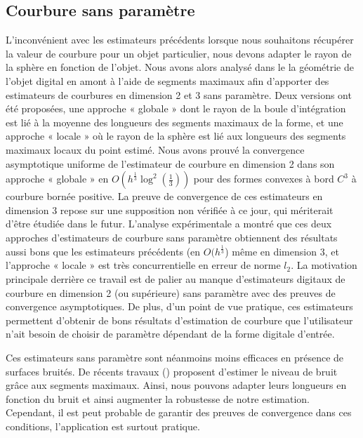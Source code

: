 \subsection*{Courbure sans paramètre}
%
L'inconvénient avec les estimateurs précédents lorsque nous souhaitons récupérer
la valeur de courbure pour un objet particulier, nous devons adapter le rayon de
la sphère en fonction de l'objet. Nous avons alors analysé dans le
 la géométrie de l'objet digital en amont à
l'aide de segments maximaux afin d'apporter des estimateurs de courbures en
dimension 2 et 3 sans paramètre. Deux versions ont été proposées, une approche «
globale » dont le rayon de la boule d'intégration est lié à la moyenne des
longueurs des segments maximaux de la forme, et une approche « locale » où le
rayon de la sphère est lié aux longueurs des segments maximaux locaux du point
estimé.
%
Nous avons prouvé la convergence asymptotique uniforme de l'estimateur de
courbure en dimension 2 dans son approche « globale » en $O\left(h^\frac{1}{3} \log^2
\left(\frac{1}{3}\right)\right)$ pour des formes convexes à bord $C^3$ à courbure
bornée positive. La preuve de convergence de ces estimateurs en dimension 3
repose sur une supposition non vérifiée à ce jour, qui mériterait d'être étudiée
dans le futur.
%
L'analyse expérimentale a montré que ces deux approches d'estimateurs de
courbure sans paramètre obtiennent des résultats aussi bons que les estimateurs
précédents (en $O(h^\frac{1}{3}$) même en dimension 3, et l'approche « locale »
est très concurrentielle en erreur de norme $l_2$.
%
La motivation principale derrière ce travail est de palier au manque
d'estimateurs digitaux de courbure en dimension 2 (ou supérieure) sans paramètre
avec des preuves de convergence asymptotiques. De plus, d'un point de vue
pratique, ces estimateurs permettent d'obtenir de bons résultats d'estimation de
courbure que l'utilisateur n'ait besoin de choisir de paramètre dépendant de la
forme digitale d'entrée.

Ces estimateurs sans paramètre sont néanmoins moins efficaces en présence de surfaces
bruités. De récents travaux () proposent
d'estimer le niveau de bruit grâce aux segments maximaux. Ainsi, nous pouvons
adapter leurs longueurs en fonction du bruit et ainsi augmenter la robustesse de
notre estimation. Cependant, il est peut probable de garantir des preuves de
convergence dans ces conditions, l'application est surtout pratique.
%
